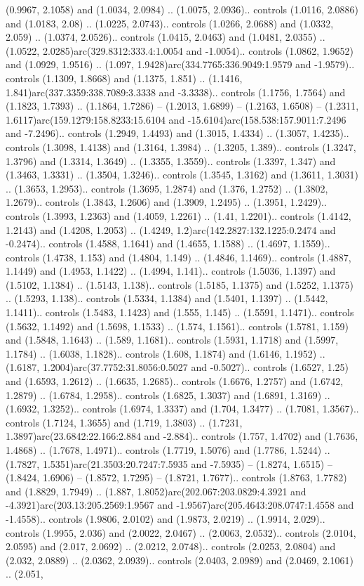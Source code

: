 (0.9967, 2.1058) and (1.0034, 2.0984) .. (1.0075, 2.0936).. controls (1.0116, 2.0886) and (1.0183, 2.08) .. (1.0225, 2.0743).. controls (1.0266, 2.0688) and (1.0332, 2.059) .. (1.0374, 2.0526).. controls (1.0415, 2.0463) and (1.0481, 2.0355) .. (1.0522, 2.0285)arc(329.8312:333.4:1.0054 and -1.0054).. controls (1.0862, 1.9652) and (1.0929, 1.9516) .. (1.097, 1.9428)arc(334.7765:336.9049:1.9579 and -1.9579).. controls (1.1309, 1.8668) and (1.1375, 1.851) .. (1.1416, 1.841)arc(337.3359:338.7089:3.3338 and -3.3338).. controls (1.1756, 1.7564) and (1.1823, 1.7393) .. (1.1864, 1.7286) -- (1.2013, 1.6899) -- (1.2163, 1.6508) -- (1.2311, 1.6117)arc(159.1279:158.8233:15.6104 and -15.6104)arc(158.538:157.9011:7.2496 and -7.2496).. controls (1.2949, 1.4493) and (1.3015, 1.4334) .. (1.3057, 1.4235).. controls (1.3098, 1.4138) and (1.3164, 1.3984) .. (1.3205, 1.389).. controls (1.3247, 1.3796) and (1.3314, 1.3649) .. (1.3355, 1.3559).. controls (1.3397, 1.347) and (1.3463, 1.3331) .. (1.3504, 1.3246).. controls (1.3545, 1.3162) and (1.3611, 1.3031) .. (1.3653, 1.2953).. controls (1.3695, 1.2874) and (1.376, 1.2752) .. (1.3802, 1.2679).. controls (1.3843, 1.2606) and (1.3909, 1.2495) .. (1.3951, 1.2429).. controls (1.3993, 1.2363) and (1.4059, 1.2261) .. (1.41, 1.2201).. controls (1.4142, 1.2143) and (1.4208, 1.2053) .. (1.4249, 1.2)arc(142.2827:132.1225:0.2474 and -0.2474).. controls (1.4588, 1.1641) and (1.4655, 1.1588) .. (1.4697, 1.1559).. controls (1.4738, 1.153) and (1.4804, 1.149) .. (1.4846, 1.1469).. controls (1.4887, 1.1449) and (1.4953, 1.1422) .. (1.4994, 1.141).. controls (1.5036, 1.1397) and (1.5102, 1.1384) .. (1.5143, 1.138).. controls (1.5185, 1.1375) and (1.5252, 1.1375) .. (1.5293, 1.138).. controls (1.5334, 1.1384) and (1.5401, 1.1397) .. (1.5442, 1.1411).. controls (1.5483, 1.1423) and (1.555, 1.145) .. (1.5591, 1.1471).. controls (1.5632, 1.1492) and (1.5698, 1.1533) .. (1.574, 1.1561).. controls (1.5781, 1.159) and (1.5848, 1.1643) .. (1.589, 1.1681).. controls (1.5931, 1.1718) and (1.5997, 1.1784) .. (1.6038, 1.1828).. controls (1.608, 1.1874) and (1.6146, 1.1952) .. (1.6187, 1.2004)arc(37.7752:31.8056:0.5027 and -0.5027).. controls (1.6527, 1.25) and (1.6593, 1.2612) .. (1.6635, 1.2685).. controls (1.6676, 1.2757) and (1.6742, 1.2879) .. (1.6784, 1.2958).. controls (1.6825, 1.3037) and (1.6891, 1.3169) .. (1.6932, 1.3252).. controls (1.6974, 1.3337) and (1.704, 1.3477) .. (1.7081, 1.3567).. controls (1.7124, 1.3655) and (1.719, 1.3803) .. (1.7231, 1.3897)arc(23.6842:22.166:2.884 and -2.884).. controls (1.757, 1.4702) and (1.7636, 1.4868) .. (1.7678, 1.4971).. controls (1.7719, 1.5076) and (1.7786, 1.5244) .. (1.7827, 1.5351)arc(21.3503:20.7247:7.5935 and -7.5935) -- (1.8274, 1.6515) -- (1.8424, 1.6906) -- (1.8572, 1.7295) -- (1.8721, 1.7677).. controls (1.8763, 1.7782) and (1.8829, 1.7949) .. (1.887, 1.8052)arc(202.067:203.0829:4.3921 and -4.3921)arc(203.13:205.2569:1.9567 and -1.9567)arc(205.4643:208.0747:1.4558 and -1.4558).. controls (1.9806, 2.0102) and (1.9873, 2.0219) .. (1.9914, 2.029).. controls (1.9955, 2.036) and (2.0022, 2.0467) .. (2.0063, 2.0532).. controls (2.0104, 2.0595) and (2.017, 2.0692) .. (2.0212, 2.0748).. controls (2.0253, 2.0804) and (2.032, 2.0889) .. (2.0362, 2.0939).. controls (2.0403, 2.0989) and (2.0469, 2.1061) .. (2.051, 